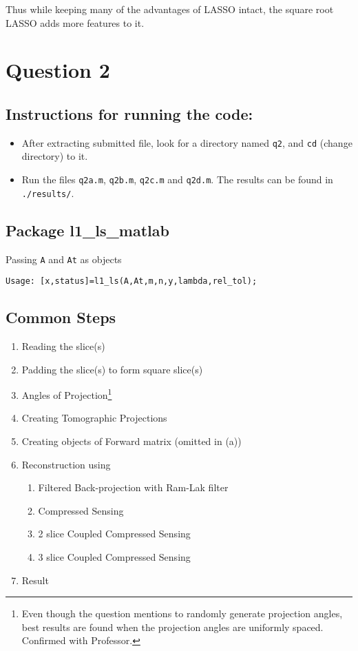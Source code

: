 \documentclass[fleqn, 11pt]{article}
\begin{document}
Thus while keeping many of the advantages of LASSO intact, the square root LASSO 
adds more features to it.

\newpage
\section*{Question 2}
\setcounter{equation}{0}

\subsection*{Instructions for running the code:}
\begin{itemize}[noitemsep]
    \item After extracting submitted file, look for a directory named \texttt{q2}, and \texttt{cd} (change directory) to it.
    \item Run the files \texttt{q2a.m}, \texttt{q2b.m}, \texttt{q2c.m} and \texttt{q2d.m}. The results can be found in \texttt{./results/}.
\end{itemize}

\subsection*{Package l1\_ls\_matlab}
Passing \texttt{A} and \texttt{At} as objects
\begin{verbatim}
Usage: [x,status]=l1_ls(A,At,m,n,y,lambda,rel_tol);
\end{verbatim}

\subsection*{Common Steps}
\begin{enumerate}[noitemsep]
    \item Reading the slice(s)
    \item Padding the slice(s) to form square slice(s)
    \item Angles of Projection\footnote{Even though the question mentions to randomly generate projection angles, best results are found when the projection angles are uniformly spaced. Confirmed with Professor.}
    \item Creating Tomographic Projections
    \item Creating objects of Forward matrix (omitted in (a))
    \item Reconstruction using
    \begin{enumerate}[noitemsep]
        \item Filtered Back-projection with Ram-Lak filter
        \item Compressed Sensing
        \item 2 slice Coupled Compressed Sensing
        \item 3 slice Coupled Compressed Sensing
    \end{enumerate}
    \item Result
\end{enumerate}
\end{document}
